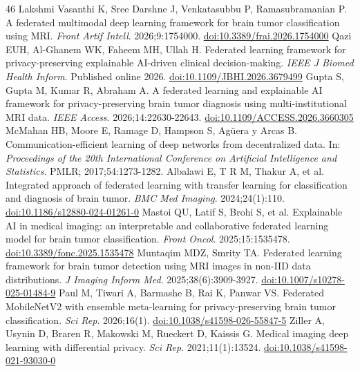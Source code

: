 \begin{thebibliography}{46}
 Lakshmi Vasanthi K, Sree Darshne J, Venkatasubbu P, Ramasubramanian P. A federated multimodal deep learning framework for brain tumor classification using MRI. \textit{Front Artif Intell}. 2026;9:1754000. \href{https://doi.org/10.3389/frai.2026.1754000}{doi:10.3389/frai.2026.1754000}
 Qazi EUH, Al-Ghanem WK, Faheem MH, Ullah H. Federated learning framework for privacy-preserving explainable AI-driven clinical decision-making. \textit{IEEE J Biomed Health Inform}. Published online 2026. \href{https://doi.org/10.1109/JBHI.2026.3679499}{doi:10.1109/JBHI.2026.3679499}
 Gupta S, Gupta M, Kumar R, Abraham A. A federated learning and explainable AI framework for privacy-preserving brain tumor diagnosis using multi-institutional MRI data. \textit{IEEE Access}. 2026;14:22630-22643. \href{https://doi.org/10.1109/ACCESS.2026.3660305}{doi:10.1109/ACCESS.2026.3660305}
 McMahan HB, Moore E, Ramage D, Hampson S, Ag\"uera y Arcas B. Communication-efficient learning of deep networks from decentralized data. In: \textit{Proceedings of the 20th International Conference on Artificial Intelligence and Statistics}. PMLR; 2017;54:1273-1282.
 Albalawi E, T R M, Thakur A, et al. Integrated approach of federated learning with transfer learning for classification and diagnosis of brain tumor. \textit{BMC Med Imaging}. 2024;24(1):110. \href{https://doi.org/10.1186/s12880-024-01261-0}{doi:10.1186/s12880-024-01261-0}
 Mastoi QU, Latif S, Brohi S, et al. Explainable AI in medical imaging: an interpretable and collaborative federated learning model for brain tumor classification. \textit{Front Oncol}. 2025;15:1535478. \href{https://doi.org/10.3389/fonc.2025.1535478}{doi:10.3389/fonc.2025.1535478}
 Muntaqim MDZ, Smrity TA. Federated learning framework for brain tumor detection using MRI images in non-IID data distributions. \textit{J Imaging Inform Med}. 2025;38(6):3909-3927. \href{https://doi.org/10.1007/s10278-025-01484-9}{doi:10.1007/s10278-025-01484-9}
 Paul M, Tiwari A, Barmashe B, Rai K, Panwar VS. Federated MobileNetV2 with ensemble meta-learning for privacy-preserving brain tumor classification. \textit{Sci Rep}. 2026;16(1). \href{https://doi.org/10.1038/s41598-026-55847-5}{doi:10.1038/s41598-026-55847-5}
 Ziller A, Usynin D, Braren R, Makowski M, Rueckert D, Kaissis G. Medical imaging deep learning with differential privacy. \textit{Sci Rep}. 2021;11(1):13524. \href{https://doi.org/10.1038/s41598-021-93030-0}{doi:10.1038/s41598-021-93030-0}

\end{thebibliography}
